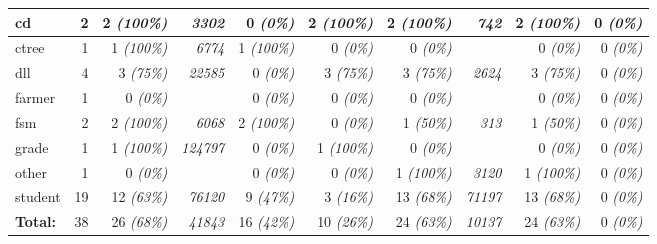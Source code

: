 \begin{table*}[ht]
\begin{center}
\begin{small}
\begin{tabular}{|l|r||r|r|r|r||r|r|r|r|}
cd & 2 & 2 \emph{\scriptsize(100\%)} & \textit{3302} & 0 \emph{\scriptsize(0\%)} & 2 \emph{\scriptsize(100\%)} & 2 \emph{\scriptsize(100\%)} & \textit{742} & 2 \emph{\scriptsize(100\%)} & 0 \emph{\scriptsize(0\%)} \\ \hline
ctree & 1 & 1 \emph{\scriptsize(100\%)} & \textit{6774} & 1 \emph{\scriptsize(100\%)} & 0 \emph{\scriptsize(0\%)} & 0 \emph{\scriptsize(0\%)} & \textit{} & 0 \emph{\scriptsize(0\%)} & 0 \emph{\scriptsize(0\%)} \\ \hline
dll & 4 & 3 \emph{\scriptsize(75\%)} & \textit{22585} & 0 \emph{\scriptsize(0\%)} & 3 \emph{\scriptsize(75\%)} & 3 \emph{\scriptsize(75\%)} & \textit{2624} & 3 \emph{\scriptsize(75\%)} & 0 \emph{\scriptsize(0\%)} \\ \hline
farmer & 1 & 0 \emph{\scriptsize(0\%)} & \textit{} & 0 \emph{\scriptsize(0\%)} & 0 \emph{\scriptsize(0\%)} & 0 \emph{\scriptsize(0\%)} & \textit{} & 0 \emph{\scriptsize(0\%)} & 0 \emph{\scriptsize(0\%)} \\ \hline
fsm & 2 & 2 \emph{\scriptsize(100\%)} & \textit{6068} & 2 \emph{\scriptsize(100\%)} & 0 \emph{\scriptsize(0\%)} & 1 \emph{\scriptsize(50\%)} & \textit{313} & 1 \emph{\scriptsize(50\%)} & 0 \emph{\scriptsize(0\%)} \\ \hline
grade & 1 & 1 \emph{\scriptsize(100\%)} & \textit{124797} & 0 \emph{\scriptsize(0\%)} & 1 \emph{\scriptsize(100\%)} & 0 \emph{\scriptsize(0\%)} & \textit{} & 0 \emph{\scriptsize(0\%)} & 0 \emph{\scriptsize(0\%)} \\ \hline
other & 1 & 0 \emph{\scriptsize(0\%)} & \textit{} & 0 \emph{\scriptsize(0\%)} & 0 \emph{\scriptsize(0\%)} & 1 \emph{\scriptsize(100\%)} & \textit{3120} & 1 \emph{\scriptsize(100\%)} & 0 \emph{\scriptsize(0\%)} \\ \hline
student & 19 & 12 \emph{\scriptsize(63\%)} & \textit{76120} & 9 \emph{\scriptsize(47\%)} & 3 \emph{\scriptsize(16\%)} & 13 \emph{\scriptsize(68\%)} & \textit{71197} & 13 \emph{\scriptsize(68\%)} & 0 \emph{\scriptsize(0\%)} \\ \hline
\rowcolor{black!5}\textbf{Total:}    & 38 & 26 \emph{\scriptsize(68\%)} & \textit{41843} & 16 \emph{\scriptsize(42\%)} & 10 \emph{\scriptsize(26\%)} & 24 \emph{\scriptsize(63\%)} & \textit{10137} & 24 \emph{\scriptsize(63\%)} & 0 \emph{\scriptsize(0\%)} \\ \hline
\end{tabular}
\end{small}
\end{center}
\label{arepair-experiments}
\end{table*}

